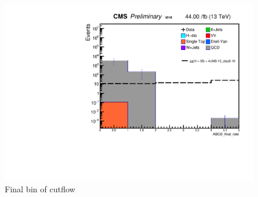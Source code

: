  \begin{figure}[h!]
   \caption{Final bin of cutflow}
   \label{fig:Finalbin}
   \centering
   \includegraphics[width=0.67\linewidth]{figs/log_Oct6CutflAnalysisNote_MS-15_ctauS-10_ABCD_final_rate.pdf}
 \end{figure}



